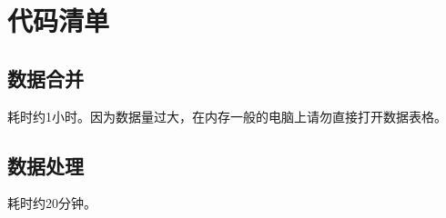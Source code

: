 \documentclass[../main]{subfiles}
\begin{document}
\chapter{代码清单}%
\label{cha:code}

\section{数据合并}%
\label{sec:merge}

耗时约1小时。因为数据量过大，在内存一般的电脑上请勿直接打开数据表格。
\renewcommand{\fcolorbox}[4][]{#4}

\section{数据处理}%
\label{sec:process}

耗时约20分钟。
\end{document}
